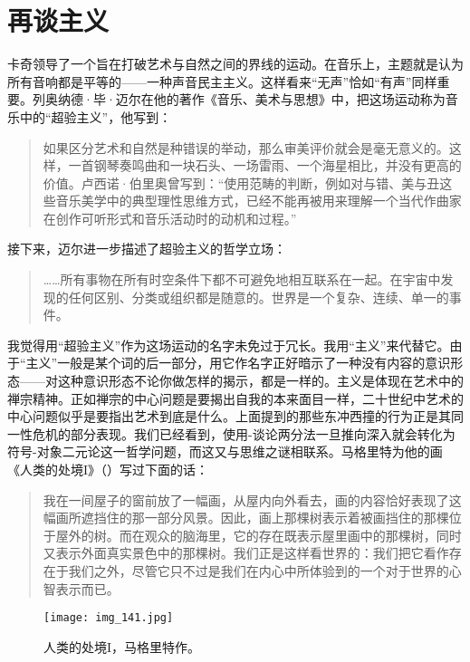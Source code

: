 \section{再谈主义}

卡奇领导了一个旨在打破艺术与自然之间的界线的运动。在音乐上，主题就是认为所有音响都是平等的——一种声音民主主义。这样看来“无声”恰如“有声”同样重要。列奥纳德·毕·迈尔在他的著作《音乐、美术与思想》中，把这场运动称为音乐中的“超验主义”，他写到：

\begin{quote}
如果区分艺术和自然是种错误的举动，那么审美评价就会是毫无意义的。这样，一首钢琴奏鸣曲和一块石头、一场雷雨、一个海星相比，并没有更高的价值。卢西诺·伯里奥\lnote{[一位现代作曲家]}曾写到：“使用范畴的判断，例如对与错、美与丑这些音乐美学中的典型理性思维方式，已经不能再被用来理解一个当代作曲家在创作可听形式和音乐活动时的动机和过程。”
\end{quote}

接下来，迈尔进一步描述了超验主义的哲学立场：

\begin{quote}
……所有事物在所有时空条件下都不可避免地相互联系在一起。在宇宙中发现的任何区别、分类或组织都是随意的。世界是一个复杂、连续、单一的事件。
\end{quote}

我觉得用“超验主义”作为这场运动的名字未免过于冗长。我用“主义”来代替它。由于“主义”一般是某个词的后一部分，用它作名字正好暗示了一种没有内容的意识形态——对这种意识形态不论你做怎样的揭示，都是一样的。主义是体现在艺术中的禅宗精神。正如禅宗的中心问题是要揭出自我的本来面目一样，二十世纪中艺术的中心问题似乎是要指出艺术到底是什么。上面提到的那些东冲西撞的行为正是其同一性危机的部分表现。我们已经看到，使用-谈论两分法一旦推向深入就会转化为符号-对象二元论这一哲学问题，而这又与思维之谜相联系。马格里特为他的画《人类的处境I》（）写过下面的话：

\begin{quote}
我在一间屋子的窗前放了一幅画，从屋内向外看去，画的内容恰好表现了这幅画所遮挡住的那一部分风景。因此，画上那棵树表示着被画挡住的那棵位于屋外的树。而在观众的脑海里，它的存在既表示屋里画中的那棵树，同时又表示外面真实景色中的那棵树。我们正是这样看世界的：我们把它看作存在于我们之外，尽管它只不过是我们在内心中所体验到的一个对于世界的心智表示而已。
\end{quote}

\begin{figure}
\texttt{[image: img\_141.jpg]}
\caption[人类的处境I，马格里特作。]
  {人类的处境I，马格里特作。}
\end{figure}

